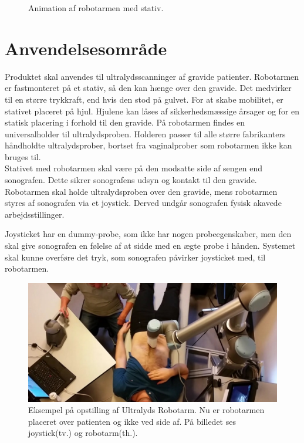 \begin{figure}[H]
\begin{minipage}{0.55\textwidth}
		\caption{Animation af robotarmen med stativ.}
		\label{Robotstativ}
	\end{minipage}
\end{figure}

\section{Anvendelsesområde}
Produktet skal anvendes til ultralydsscanninger af gravide patienter. Robotarmen er fastmonteret på et stativ, så den kan hænge over den gravide. Det medvirker til en større trykkraft, end hvis den stod på gulvet. For at skabe mobilitet, er stativet placeret på hjul. Hjulene kan låses af sikkerhedsmæssige årsager og for en statisk placering i forhold til den gravide. På robotarmen findes en universalholder til ultralydsproben. Holderen passer til alle større fabrikanters håndholdte ultralydsprober, bortset fra vaginalprober som robotarmen ikke kan bruges til.\\

Stativet med robotarmen skal være på den modsatte side af sengen end sonografen. Dette sikrer sonografens udsyn og kontakt til den gravide. \\
Robotarmen skal holde ultralydsproben over den gravide, mens robotarmen styres af sonografen via et joystick. Derved undgår sonografen fysisk akavede arbejdsstillinger.

Joysticket har en dummy-probe, som ikke har nogen probeegenskaber, men den skal give sonografen en følelse af at sidde med en ægte probe i hånden.
Systemet skal kunne overføre det tryk, som sonografen påvirker joysticket med, til robotarmen.
 

\begin{figure}[H]\centering
	\includegraphics[width = 1.0\textwidth]{Figurer/ergonomiskLosning.jpg}
	\caption{Eksempel på opstilling af Ultralyds Robotarm. Nu er robotarmen placeret over patienten og ikke ved side af. På billedet ses joystick(tv.) og robotarm(th.).  }
	\label{ergonomiskLosning}
\end{figure}

